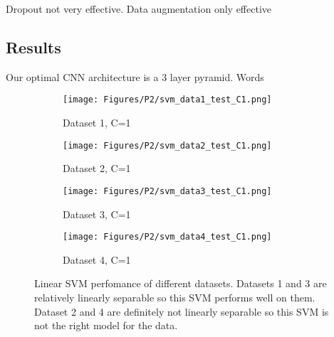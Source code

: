 \documentclass[10pt,twoside]{article}
\begin{document}
Dropout not very effective.
Data augmentation only effective


\subsection{Results}
Our optimal CNN architecture is a 3 layer pyramid. Words

\begin{figure}[h]
        \begin{subfigure}[b]{0.25\textwidth}
                \centering
                \texttt{[image: Figures/P2/svm\_data1\_test\_C1.png]}
                \caption{Dataset 1, C=1}
        \end{subfigure}%
        \begin{subfigure}[b]{0.25\textwidth}
                \centering
                \texttt{[image: Figures/P2/svm\_data2\_test\_C1.png]}
                \caption{Dataset 2, C=1}
        \end{subfigure}%
        \begin{subfigure}[b]{0.25\textwidth}
                \centering
                \texttt{[image: Figures/P2/svm\_data3\_test\_C1.png]}
                \caption{Dataset 3, C=1}
        \end{subfigure}%
        \begin{subfigure}[b]{0.25\textwidth}
                \centering
                \texttt{[image: Figures/P2/svm\_data4\_test\_C1.png]}
                \caption{Dataset 4, C=1}
        \end{subfigure}
        \caption{Linear SVM perfomance of different datasets. Datasets 1 and 3 are relatively linearly separable so this SVM performs well on them. Dataset 2 and 4 are definitely not linearly separable so this SVM is not the right model for the data.}\label{fig:animals}
\end{figure}

\vfill
\end{document}
